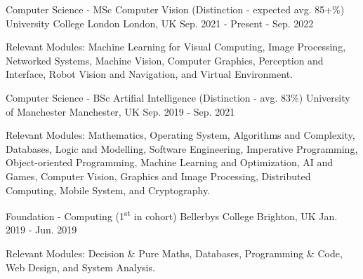 

\begin{cventries}

  \cventry
    {Computer Science - MSc Computer Vision (Distinction - expected avg. 85+\%)} %
    {University College London} %
    {London, UK} %
    {Sep. 2021 - Present - Sep. 2022} %
    {
      \begin{cvitems} %
        \item {Relevant Modules: Machine Learning for Visual Computing, Image Processing, Networked Systems, Machine Vision, Computer Graphics, Perception and Interface, Robot Vision and Navigation, and Virtual Environment.}
      \end{cvitems}
    }
    
  \cventry
    {Computer Science - BSc Artifial Intelligence (Distinction - avg. 83\%)} %
    {University of Manchester} %
    {Manchester, UK} %
    {Sep. 2019 - Sep. 2021} %
    {
      \begin{cvitems} %
        \item {Relevant Modules: Mathematics, Operating System, Algorithms and Complexity, Databases, Logic and Modelling, Software Engineering, Imperative Programming, Object-oriented Programming, Machine Learning and Optimization, AI and Games,  Computer Vision, Graphics and Image Processing, Distributed Computing, Mobile System, and Cryptography.}
      \end{cvitems}
    }
    
    \cventry
    {Foundation - Computing (1\textsuperscript{st} in cohort)} %
    {Bellerbys College} %
    {Brighton, UK} %
    {Jan. 2019 - Jun. 2019} %
    {
     \begin{cvitems} %
        \item {Relevant Modules: Decision \& Pure Maths, Databases, Programming \& Code, Web Design, and System Analysis.}
      \end{cvitems}
    }
    

\end{cventries}
